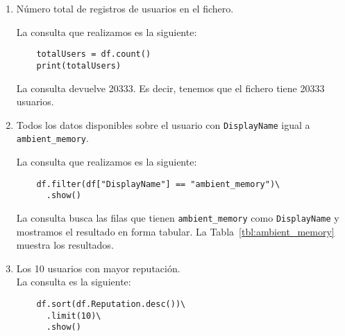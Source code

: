 \documentclass[12pt,a4paper,twoside,openright,titlepage,final]{article}
\begin{document}
\begin{enumerate}
	\item Número total de registros de usuarios en el fichero.
	
	La consulta que realizamos es la siguiente:
	
	\begin{verbatim}
	totalUsers = df.count()
	print(totalUsers)
	\end{verbatim}
	
	La consulta devuelve 20333. Es decir, tenemos que el fichero tiene 20333 usuarios.
	
	\item Todos los datos disponibles sobre el usuario con \texttt{DisplayName} igual a \texttt{ambient\_memory}.
	
	La consulta que realizamos es la siguiente:
	
	\begin{verbatim}
	df.filter(df["DisplayName"] == "ambient_memory")\
	  .show()
	\end{verbatim}
	
	La consulta busca las filas que tienen \texttt{ambient\_memory} como \texttt{DisplayName} y mostramos el resultado en forma tabular. La Tabla~\ref{tbl:ambient_memory} muestra los resultados.
	
	\begin{table}[htbp!]
		\centering
		\caption{Información del usuario \texttt{ambient\_memory}}
		\label{tbl:ambient_memory}
	\end{table}
	
	\item Los 10 usuarios con mayor reputación.\\
	
	La consulta es la siguiente:
	
	\begin{verbatim}
	df.sort(df.Reputation.desc())\
	  .limit(10)\
	  .show()
	

\end{verbatim}
\end{enumerate}
\end{document}
